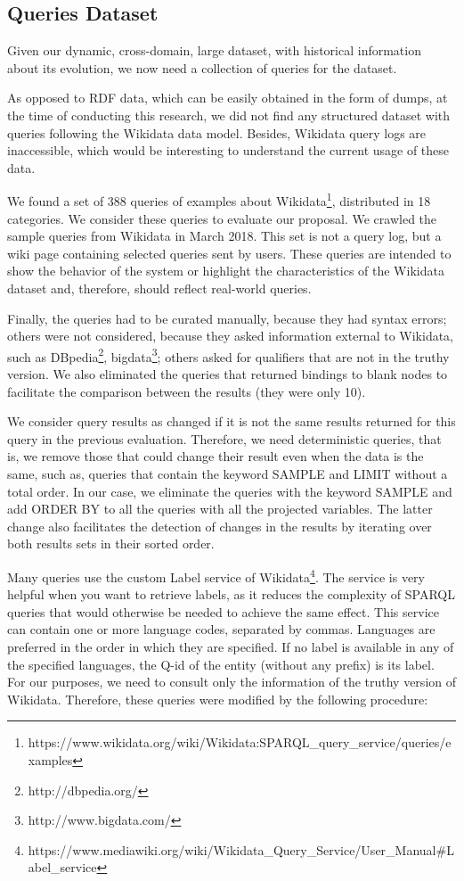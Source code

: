 \documentclass[runningheads]{llncs}
\begin{document}
\subsection{Queries Dataset}

Given our dynamic, cross-domain, large dataset, with historical information about its evolution, we now need a collection of queries for the dataset.

As opposed to RDF data, which can be easily obtained in the form of dumps, at the time of conducting this research, we did not find any structured dataset with queries following the Wikidata data model. Besides, Wikidata query logs are inaccessible, which would be interesting to understand the current usage of these data.

We found a set of 388 queries of examples about Wikidata\footnote{https://www.wikidata.org/wiki/Wikidata:SPARQL\_query\_service/queries/examples}, distributed in 18 categories. We consider these queries to evaluate our proposal. We crawled the sample queries from Wikidata in March 2018. This set is not a query log, but a wiki page containing selected queries sent by users. These queries are intended to show the behavior of the system or highlight the characteristics of the Wikidata dataset and, therefore, should reflect real-world queries.

Finally, the queries had to be curated manually, because they had syntax errors; others were not considered, because they asked information external to Wikidata, such as DBpedia\footnote{http://dbpedia.org/}, bigdata\footnote{http://www.bigdata.com/}; others asked for qualifiers that are not in the truthy version. We also eliminated the queries that returned bindings to blank nodes to facilitate the comparison between the results (they were only 10).

We consider query results as changed if it is not the same results returned for this query in the previous evaluation. Therefore, we need deterministic queries, that is, we remove those that could change their result even when the data is the same, such as, queries that contain the keyword SAMPLE and LIMIT without a total order. In our case, we eliminate the queries with the keyword SAMPLE and add ORDER BY to all the queries with all the projected variables. The latter change also facilitates the detection of changes in the results by iterating over both results sets in their sorted order.

Many queries use the custom Label service of Wikidata\footnote{https://www.mediawiki.org/wiki/Wikidata\_Query\_Service/User\_Manual\#Label\_service}. The service is very helpful when you want to retrieve labels, as it reduces the complexity of SPARQL queries that would otherwise be needed to achieve the same effect. This service can contain one or more language codes, separated by commas. Languages are preferred in the order in which they are specified. If no label is available in any of the specified languages, the Q-id of the entity (without any prefix) is its label. For our purposes, we need to consult only the information of the truthy version of Wikidata. Therefore, these queries were modified by the following procedure:
\end{document}
